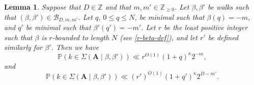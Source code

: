 \documentclass[11pt,reqno]{amsart}
\numberwithin{equation}{section}
\newtheorem{lemma}[theorem]{Lemma}
\theoremstyle{definition}
\theoremstyle{remark}
\newcommand{\mb}{\mathbb}
\newcommand{\mbf}{\mathbf}
\renewcommand{\le}{\leqslant}
\renewcommand{\ge}{\geqslant}
\newcommand\Z{\mathbb{Z}}
\begin{document}
\begin{lemma}\label{lem10.3} Suppose that $D \in \Z$ and that $m, m' \in \Z_{\ge 0}$. Let $\beta, \beta'$ be walks such that $(\beta,\beta') \in \mathscr{B}_{D,m,m'}$. Let $q$, $0 \le q \le N$, be minimal such that $\beta(q) = -m$, and $q'$ be minimal such that $\beta'(q') = -m'$. Let $r$ be the least positive integer such that $\beta$ is $r$-bounded to length $N$ \textup{(}see \cref{r-beta-def}\textup{)}, and let $r'$ be defined similarly for $\beta'$. Then we have \begin{equation}\label{lem93-1} \mb{P}(k \in \Sigma(\mbf{A} \mid \beta,\beta')) \ll r^{O(1)} (1 + q)^{\kappa} 2^{-m},\end{equation} and 
\begin{equation}\label{lem93-2} \mb{P}(k \in \Sigma(\mbf{A} \mid \beta,\beta')) \ll (r')^{O(1)} (1 + q')^{\kappa} 2^{D-m'}.\end{equation} 
\end{lemma}
\end{document}
